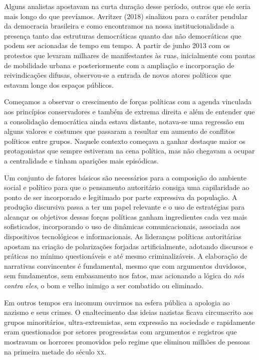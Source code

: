 Alguns analistas apostavam na curta duração desse período, outros que
ele seria mais longo do que prevíamos. Avritzer (2018) sinalizou para o
caráter pendular da democracia brasileira e como encontramos na nossa
institucionalidade a presença tanto das estruturas democráticas quanto
das não democráticas que podem ser acionadas de tempo em tempo. A partir
de junho 2013 com os protestos que levaram milhares de manifestantes às
ruas, inicialmente com pautas de mobilidade urbana e posteriormente com
a ampliação e incorporação de reivindicações difusas, observou-se a
entrada de novos atores políticos que estavam longe dos espaços
públicos.

Começamos a observar o crescimento de forças políticas com a agenda
vinculada aos princípios conservadores e também de extrema direita e
além de entender que a consolidação democrática ainda estava distante,
notava-se uma regressão em alguns valores e costumes que passaram a
resultar em aumento de conflitos políticos entre grupos. Naquele
contexto começava a ganhar destaque maior os protagonistas que sempre
estiveram na cena política, mas não chegavam a ocupar a centralidade e
tinham aparições mais episódicas.

Um conjunto de fatores básicos são necessários para a composição do
ambiente social e político para que o pensamento autoritário consiga uma
capilaridade ao ponto de ser incorporado e legitimado por parte
expressiva da população. A produção discursiva passa a ter um papel
relevante e o uso de estratégias para alcançar os objetivos dessas
forças políticas ganham ingredientes cada vez mais sofisticados,
incorporando o uso de dinâmicas comunicacionais, associada aos
dispositivos tecnológicos e informacionais. As lideranças políticas
autoritárias apostam na criação de polarizações forjadas
artificialmente, adotando discursos e práticas no mínimo questionáveis e
até mesmo criminalizáveis. A elaboração de narrativas convincentes é
fundamental, mesmo que com argumentos duvidosos, sem fundamentos, sem
embasamento nos fatos, mas acionando a lógica do \textit{nós contra eles}, o bom
e velho inimigo a ser combatido ou eliminado.

Em outros tempos era incomum ouvirmos na esfera pública a apologia ao
nazismo e seus crimes. O enaltecimento das ideias nazistas ficava
circunscrito aos grupos minoritários, ultra-extremistas, sem expressão
na sociedade e rapidamente eram questionados por setores progressistas
com argumentos e registros que mostravam os horrores promovidos pelo
regime que eliminou milhões de pessoas na primeira metade do século \textsc{xx}.

